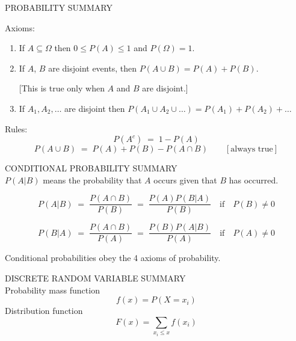 {\begin{framed}
PROBABILITY SUMMARY

\medskip

Axioms:
\begin{enumerate}
\item If $A\subseteq \Omega$ then $0\leq P(A)\leq 1$ and $P(\Omega)=1$.
\item If $A$, $B$ are disjoint events, then $P(A\cup B)=P(A)+P(B)$.

[This is true only when $A$ and $B$ are disjoint.]
\item If $A_1,A_2,\dots$ are disjoint then $P(A_1\cup A_2
\cup\dots)=P(A_1)+P(A_2)+\dots$
\end{enumerate}
Rules:
$$P(A^c)\;=\;1-P(A)$$
$$P(A\cup B)\;=\;P(A)+P(B)-P(A\cap B) \qquad [\textrm{always true}]$$
\end{framed}

\newpage
\begin{framed}
CONDITIONAL PROBABILITY SUMMARY\\

$P(A|B)$ means the probability that $A$ occurs given that $B$ has
occurred.

$$P(A|B)\;=\;\frac{P(A\cap B)}{P(B)}\;=\;\frac{P(A)P(B|A)}{P(B)}\quad \textrm{if}\quad P(B)\neq0$$

$$P(B|A)\;=\;\frac{P(A\cap B)}{P(A)}\;=\;\frac{P(B)P(A|B)}{P(A)}\quad \textrm{if}\quad P(A)\neq 0$$

Conditional probabilities obey the 4 axioms of probability.
\end{framed}

\begin{framed}
DISCRETE RANDOM VARIABLE SUMMARY\\

Probability mass function $$f(x)=P(X=x_i)$$
Distribution function $$F(x)=\sum_{x_i\leq x}f(x_i)$$


\end{framed}}

